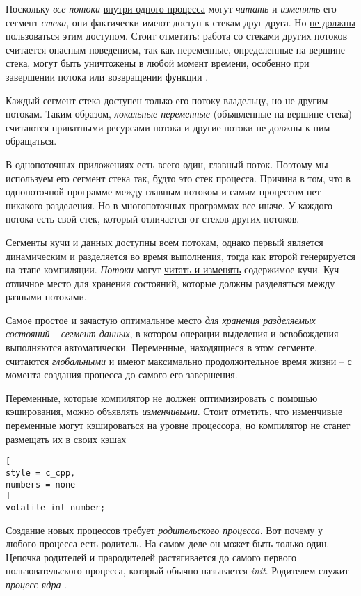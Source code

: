 \documentclass[%
	11pt,
	a4paper,
	utf8,
		]{article}
\begin{document}
Поскольку \emph{все потоки} \underline{внутри одного процесса} могут \emph{читать} и \emph{изменять} его сегмент \emph{стека}, они фактически имеют доступ к стекам друг друга. Но \underline{не должны} пользоваться этим доступом. Стоит отметить: работа со стеками других потоков считается опасным поведением, так как переменные, определенные на вершине стека, могут быть уничтожены в любой момент времени, особенно при завершении потока или возвращении функции \cite[]{amini-extreme-c:2022}.

Каждый сегмент стека доступен только его потоку-владельцу, но не другим потокам. Таким образом, \emph{локальные переменные} (объявленные на вершине стека) считаются приватными ресурсами потока и другие потоки не должны к ним обращаться.

В однопоточных приложениях есть всего один, главный поток. Поэтому мы используем его сегмент стека так, будто это стек процесса. Причина в том, что в однопоточной программе между главным потоком и самим процессом нет никакого разделения. Но в многопоточных программах все иначе. У каждого потока есть свой стек, который отличается от стеков других потоков.

Сегменты кучи и данных доступны всем потокам, однако первый является динамическим и разделяется во время выполнения, тогда как второй генерируется на этапе компиляции. \emph{Потоки} могут \underline{читать и изменять} содержимое кучи. Куч -- отличное место для хранения состояний, которые должны разделяться между разными потоками.

Самое простое и зачастую оптимальное место \emph{для хранения разделяемых состояний} -- \emph{сегмент данных}, в котором операции выделения и освобождения выполняются автоматически. Переменные, находящиеся в этом сегменте, считаются \emph{глобальными} и имеют максимально продолжительное время жизни -- с момента создания процесса до самого его завершения.

Переменные, которые компилятор не должен оптимизировать с помощью кэширования, можно объявлять \emph{изменчивыми}. Стоит отметить, что изменчивые переменные могут кэшироваться на уровне процессора, но компилятор не станет размещать их в своих кэшах
\begin{lstlisting}[
style = c_cpp,
numbers = none
]
volatile int number;
\end{lstlisting}

Создание новых процессов требует \emph{родительского процесса}. Вот почему у любого процесса есть родитель. На самом деле он может быть только один. Цепочка родителей и прародителей растягивается до самого первого пользовательского процесса, который обычно называется \emph{init}. Родителем служит \emph{процесс ядра} \cite[]{amini-extreme-c:2022}.
\end{document}
